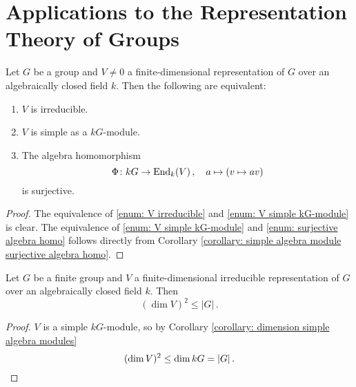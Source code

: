 \section{Applications to the Representation Theory of Groups}




\begin{lemma}\label{lemma: equivalence to irreducible}
  Let $G$ be a group and $V \neq 0$ a finite-dimensional representation of $G$ over an algebraically closed field $k$. Then the following are equivalent:
  \begin{enumerate}[label=\emph{\roman*)},leftmargin=*]
    \item \label{enum: V irreducible}
      $V$ is irreducible.
    \item \label{enum: V simple kG-module}
      $V$ is simple as a $kG$-module.
    \item \label{enum: surjective algebra homo}
      The algebra homomorphism
      \[
                \Phi
        \colon  kG
        \to     \operatorname{End}_k(V) \,,
        \quad   a
        \mapsto (v \mapsto av)
      \]
      is surjective.
  \end{enumerate}
\end{lemma}
\begin{proof}
  The equivalence of \ref{enum: V irreducible} and \ref{enum: V simple kG-module} is clear.
  The equivalence of \ref{enum: V simple kG-module} and \ref{enum: surjective algebra homo} follows directly from Corollary \ref{corollary: simple algebra module surjective algebra homo}.
\end{proof}


\begin{corollary}
  Let $G$ be a finite group and $V$ a finite-dimensional irreducible representation of $G$ over an algebraically closed field $k$.
  Then
  \[
          \left( \dim V \right)^2
    \leq |G| \,.
  \]
\end{corollary}


\begin{proof}
  $V$ is a simple $kG$-module, so by Corollary \ref{corollary: dimension simple algebra modules}
  \[
          (\dim V)^2
    \leq  \dim kG
    =     |G| \,.
    \qedhere
  \]
\end{proof}
